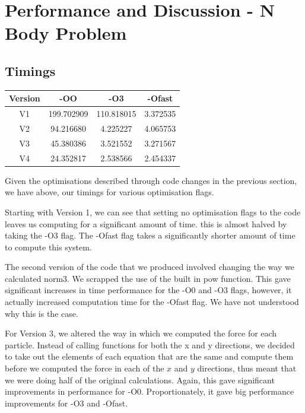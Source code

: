 \section{Performance and Discussion - N Body Problem}
\subsection{Timings}
\begin{center}
  \begin{tabular}{|c|c|c|c|}
    \hline
    Version & -OO & -O3 & -Ofast\\
    \hline
    V1 & 199.702909 & 110.818015 & 3.372535\\
    V2 & 94.216680 & 4.225227 & 4.065753\\
    V3 & 45.380386 & 3.521552 & 3.271567\\
    V4 & 24.352817 & 2.538566 & 2.454337\\
    \hline
  \end{tabular}
\end{center}
Given the optimisations described through code changes in the previous section, we have above, our timings for various optimisation flags.

Starting with Version 1, we can see that setting no optimisation flags to the code leaves us computing for a significant amount of time. this is almost halved by taking the -O3 flag. The -Ofast flag takes a significantly shorter amount of time to compute this system.

The second version of the code that we produced involved changing the way we calculated norm3. We scrapped the use of the built in pow function. This gave significant increases in time performance for the -O0 and -O3 flags, however, it actually increased computation time for the -Ofast flag. We have not understood why this is the case.

For Version 3, we altered the way in which we computed the force for each particle. Instead of calling functions for both the x and y directions, we decided to take out the elements of each equation that are the same and compute them before we computed the force in each of the $x$ and $y$ directions, thus meant that we were doing half of the original calculations. Again, this gave significant improvements in performance for -O0. Proportionately, it gave big performance improvements for -O3 and -Ofast.

